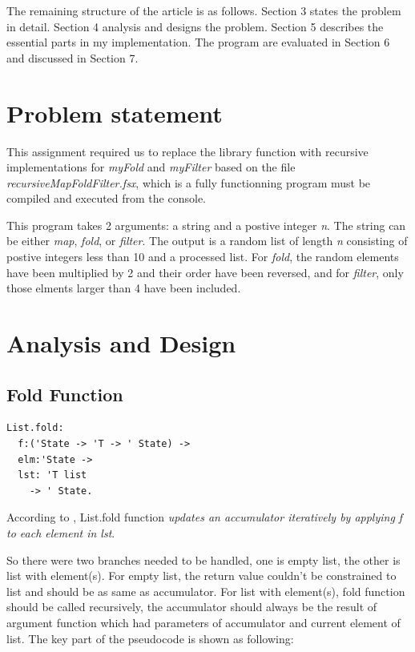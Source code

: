 \documentclass[sigconf]{acmart}
\begin{document}
The remaining structure of the article is as follows. Section 3 states the problem in detail. Section 4 analysis and designs the problem. Section 5 describes the essential parts in my implementation. The program are evaluated in Section 6 and discussed in Section 7.

\section{Problem statement}

This assignment required us to replace the library function with recursive implementations for \emph{myFold} and \emph{myFilter} based on the file \emph{recursiveMapFoldFilter.fsx}, which is a fully functionning program must be compiled and executed from the console. 

This program takes 2 arguments: a string and a postive integer \emph{n}. The string can be either \emph{map}, \emph{fold}, or \emph{filter}. The output is a random list of length \emph{n} consisting of postive integers less than 10 and a processed list. For \emph{fold}, the random elements have been multiplied by 2 and their order have been reversed, and for \emph{filter}, only those elments larger than 4 have been included.

\section{Analysis and Design}

\subsection{Fold Function}

\lstset{language=Csh}
\begin{lstlisting}
List.fold: 
  f:('State -> 'T -> ' State) -> 
  elm:'State -> 
  lst: 'T list 
    -> ' State.
\end{lstlisting}

According to \cite{sporring2019}, List.fold function \emph{updates an accumulator iteratively by applying f to each element in lst}. 

So there were two branches needed to be handled, one is empty list, the other is list with element(s). For empty list, the return value couldn't be constrained to list and should be as same as accumulator. For list with element(s), fold function should be called recursively, the accumulator should always be the result of argument function which had parameters of accumulator and current element of list. The key part of the pseudocode is shown as following:
\end{document}
